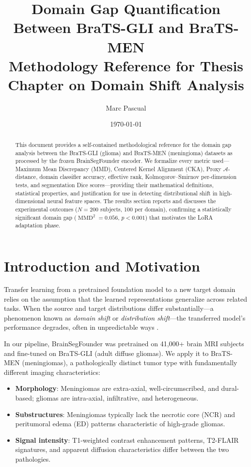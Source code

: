 \documentclass[11pt,a4paper]{article}
\title{%
  \textbf{Domain Gap Quantification Between BraTS-GLI and BraTS-MEN} \\[6pt]
  \large Methodology Reference for Thesis Chapter on Domain Shift Analysis
}
\author{Marc Pascual}
\date{\today}
\DeclareMathOperator{\MMD}{MMD}
\theoremstyle{definition}
\begin{document}
\maketitle

\begin{abstract}
This document provides a self-contained methodological reference for the domain gap analysis between the BraTS-GLI (glioma) and BraTS-MEN (meningioma) datasets as processed by the frozen BrainSegFounder encoder. We formalize every metric used---Maximum Mean Discrepancy (MMD), Centered Kernel Alignment (CKA), Proxy $\mathcal{A}$-distance, domain classifier accuracy, effective rank, Kolmogorov--Smirnov per-dimension tests, and segmentation Dice scores---providing their mathematical definitions, statistical properties, and justification for use in detecting distributional shift in high-dimensional neural feature spaces. The results section reports and discusses the experimental outcomes ($N=200$ subjects, 100 per domain), confirming a statistically significant domain gap ($\MMD^2=0.056$, $p<0.001$) that motivates the LoRA adaptation phase.
\end{abstract}

\tableofcontents
\newpage

\section{Introduction and Motivation}\label{sec:intro}

Transfer learning from a pretrained foundation model to a new target domain relies on the assumption that the learned representations generalize across related tasks. When the source and target distributions differ substantially---a phenomenon known as \emph{domain shift} or \emph{distribution shift}---the transferred model's performance degrades, often in unpredictable ways \cite{ben-david2010,quinonero-rosales2009}.

In our pipeline, BrainSegFounder \cite{brainsegfounder2024} was pretrained on 41,000+ brain MRI subjects and fine-tuned on BraTS-GLI (adult diffuse gliomas). We apply it to BraTS-MEN (meningiomas), a pathologically distinct tumor type with fundamentally different imaging characteristics:

\begin{itemize}[nosep]
  \item \textbf{Morphology}: Meningiomas are extra-axial, well-circumscribed, and dural-based; gliomas are intra-axial, infiltrative, and heterogeneous.
  \item \textbf{Substructures}: Meningiomas typically lack the necrotic core (NCR) and peritumoral edema (ED) patterns characteristic of high-grade gliomas.
  \item \textbf{Signal intensity}: T1-weighted contrast enhancement patterns, T2-FLAIR signatures, and apparent diffusion characteristics differ between the two pathologies.
\end{itemize}
\end{document}
